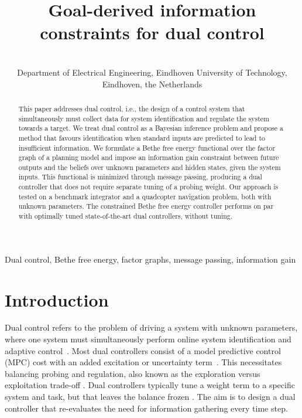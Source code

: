 \documentclass{l4dc2027}
\title{Goal-derived information constraints for dual control}
\author{%
 \Name{Wouter M. Kouw} \Email{w.m.kouw@tue.nl}\\
 \addr Department of Electrical Engineering, Eindhoven University of Technology, Eindhoven, the Netherlands%
}
\begin{document}
\maketitle

\begin{abstract}%
This paper addresses dual control, i.e., the design of a control system that simultaneously must collect data for system identification and regulate the system towards a target. We treat dual control as a Bayesian inference problem and propose a method that favours identification when standard inputs are predicted to lead to insufficient information. We formulate a Bethe free energy functional over the factor graph of a planning model and impose an information gain constraint between future outputs and the beliefs over unknown parameters and hidden states, given the system inputs. This functional is minimized through message passing, producing a dual controller that does not require separate tuning of a probing weight. Our approach is tested on a benchmark integrator and a quadcopter navigation problem, both with unknown parameters. The constrained Bethe free energy controller performs on par with optimally tuned state-of-the-art dual controllers, without tuning.
\end{abstract}

\begin{keywords}%
  Dual control, Bethe free energy, factor graphs, message passing, information gain%
\end{keywords}


\section{Introduction}\label{sec:intro}

Dual control refers to the problem of driving a system with unknown parameters, where one system must simultaneously perform online system identification and adaptive control~\citep{feldbaum1960dual}. 
Most dual controllers consist of a model predictive control (MPC) cost with an added excitation or uncertainty term~\citep{mesbah2018stochastic,heirung2017dual}. This necessitates balancing probing and regulation, also known as the exploration versus exploitation trade-off \citep{levine2018reinforcement}. Dual controllers typically tune a weight term to a specific system and task, but that leaves the balance frozen \citep{larsson2013model,mesbah2018stochastic}. 
The aim is to design a dual controller that re-evaluates the need for information gathering every time step.
\end{document}
